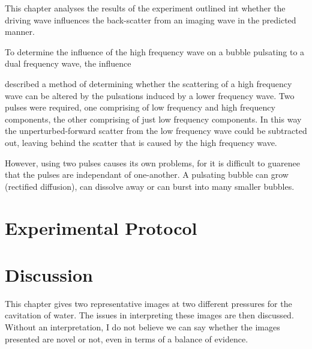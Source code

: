 This chapter analyses the results of the experiment outlined int  whether the driving  wave influences the back-scatter from an imaging wave in the predicted manner.


To determine the influence of the high frequency wave 
on a bubble pulsating to a dual frequency wave,
the influence 

 described a method of determining whether the scattering of a high frequency wave
can be altered by the pulsations induced by  a lower frequency wave.
Two pulses were required, 
one comprising of low frequency and high frequency components,
the other comprising of just low frequency components.
In this way the unperturbed-forward scatter from the low frequency wave could be subtracted out, 
leaving behind the scatter that is caused by the high frequency wave.

However, using two pulses causes its own problems,
for it is difficult to guarenee that the pulses are independant of one-another.
A pulsating bubble can grow (rectified diffusion),
can dissolve away or can burst into many smaller bubbles. 










\section{Experimental Protocol}

\section{Discussion} \label{sec:WE:discussion}




This chapter gives two representative images at two different pressures for the cavitation of water.
The issues in interpreting these images are then discussed.
Without an interpretation, I do not believe we can say whether the images presented are novel or not, 
even in terms of a balance of evidence.

